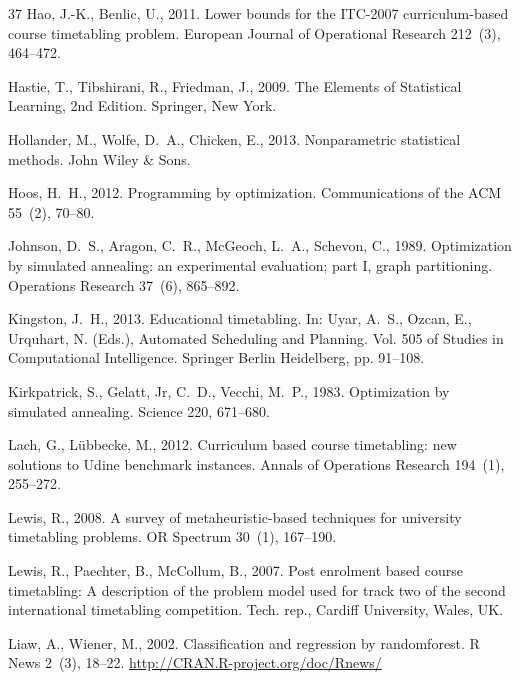 \documentclass[authoryear,12pt]{article}
\begin{document}
\begin{thebibliography}{37}
Hao, J.-K., Benlic, U., 2011. Lower bounds for the {ITC-2007} curriculum-based
  course timetabling problem. European Journal of Operational Research 212~(3),
  464--472.

Hastie, T., Tibshirani, R., Friedman, J., 2009. The Elements of Statistical
  Learning, 2nd Edition. Springer, New York.

Hollander, M., Wolfe, D.~A., Chicken, E., 2013. Nonparametric statistical
  methods. John Wiley \& Sons.

Hoos, H.~H., 2012. Programming by optimization. Communications of the ACM
  55~(2), 70--80.

Johnson, D.~S., Aragon, C.~R., McGeoch, L.~A., Schevon, C., 1989. Optimization
  by simulated annealing: an experimental evaluation; part {I}, graph
  partitioning. Operations Research 37~(6), 865--892.

Kingston, J.~H., 2013. Educational timetabling. In: Uyar, A.~S., Ozcan, E.,
  Urquhart, N. (Eds.), Automated Scheduling and Planning. Vol. 505 of Studies
  in Computational Intelligence. Springer Berlin Heidelberg, pp. 91--108.

Kirkpatrick, S., Gelatt, Jr, C.~D., Vecchi, M.~P., 1983. Optimization by
  simulated annealing. Science 220, 671--680.

Lach, G., L\"ubbecke, M., 2012. Curriculum based course timetabling: new
  solutions to {U}dine benchmark instances. Annals of Operations Research
  194~(1), 255--272.

Lewis, R., 2008. A survey of metaheuristic-based techniques for university
  timetabling problems. OR Spectrum 30~(1), 167--190.

Lewis, R., Paechter, B., McCollum, B., 2007. Post enrolment based course
  timetabling: A description of the problem model used for track two of the
  second international timetabling competition. Tech. rep., Cardiff University,
  Wales, UK.

Liaw, A., Wiener, M., 2002. Classification and regression by randomforest. R
  News 2~(3), 18--22.
\newline\urlprefix\url{http://CRAN.R-project.org/doc/Rnews/}


\end{thebibliography}
\end{document}
